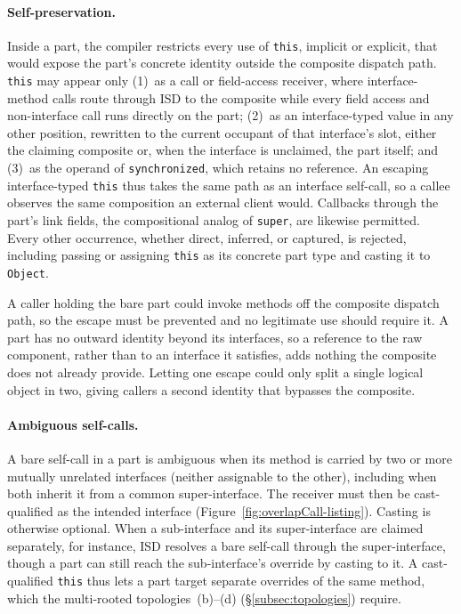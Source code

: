 \documentclass[acmsmall,nonacm]{acmart}
\theoremstyle{acmplain}
\newcommand{\code}[1]{\texttt{#1}}
\begin{document}
\paragraph{Self-preservation.}
Inside a part, the compiler restricts every use of \code{this}, implicit or explicit, that would expose the part's concrete
identity outside the composite dispatch path. \code{this} may appear only (1)~as a call or field-access receiver, where
interface-method calls route through ISD to the composite while every field access and non-interface call runs directly
on the part; (2)~as an interface-typed value in any other position, rewritten to the current occupant of that interface's
slot, either the claiming composite or, when the interface is unclaimed, the part itself; and (3)~as the operand of \code{synchronized},
which retains no reference. An escaping interface-typed \code{this} thus takes the same path as an interface self-call,
so a callee observes the same composition an external client would. Callbacks through the part's link fields, the compositional
analog of \code{super}, are likewise permitted. Every other occurrence, whether direct, inferred, or captured, is rejected,
including passing or assigning \code{this} as its concrete part type and casting it to \code{Object}.

A caller holding the bare part could invoke methods off the composite dispatch path, so the escape must be prevented and
no legitimate use should require it. A part has no outward identity beyond its interfaces, so a reference to the raw component,
rather than to an interface it satisfies, adds nothing the composite does not already provide. Letting one escape could
only split a single logical object in two, giving callers a second identity that bypasses the composite.

\paragraph{Ambiguous self-calls.}
A bare self-call in a part is ambiguous when its method is carried by two or more mutually unrelated interfaces (neither
assignable to the other), including when both inherit it from a common super-interface. The receiver must then be cast-qualified
as the intended interface (Figure~\ref{fig:overlapCall-listing}). Casting is otherwise optional. When a sub-interface and
its super-interface are claimed separately, for instance, ISD resolves a bare self-call through the super-interface, though
a part can still reach the sub-interface's override by casting to it. A cast-qualified \code{this} thus lets a part target
separate overrides of the same method, which the multi-rooted topologies~(b)--(d) (\S\ref{subsec:topologies}) require.
\end{document}
